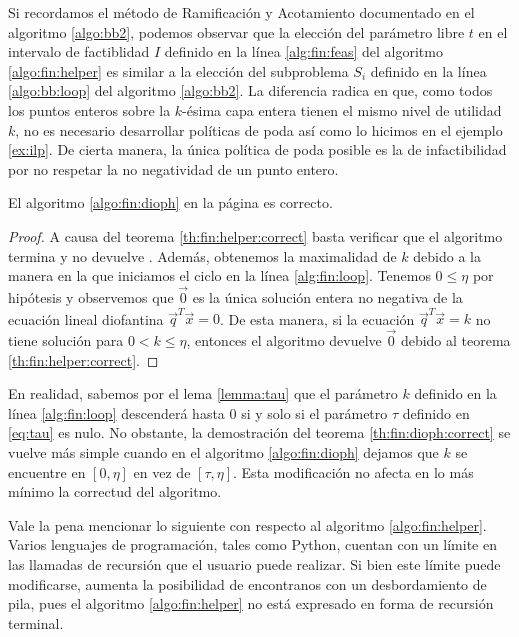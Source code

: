 Si recordamos el método de Ramificación y Acotamiento documentado en el algoritmo \ref{algo:bb2},
podemos observar que la elección del parámetro libre $t$ en el intervalo de factiblidad $I$ definido
en la línea \ref{alg:fin:feas} del algoritmo \ref{algo:fin:helper} es similar a la elección del
subproblema $S_i$ definido en la línea \ref{algo:bb:loop} del algoritmo \ref{algo:bb2}. La
diferencia radica en que, como todos los puntos enteros sobre la $k$-ésima capa entera tienen el
mismo nivel de utilidad $k$, no es necesario desarrollar políticas de poda así como lo hicimos en el
ejemplo \ref{ex:ilp}. De cierta manera, la única política de poda posible es la de infactibilidad
por no respetar la no negatividad de un punto entero.
\begin{theorem}
	\label{th:fin:dioph:correct}
	El algoritmo \ref{algo:fin:dioph} en la página \pageref{algo:fin:dioph} es correcto.
\end{theorem}
\begin{proof}
	A causa del teorema \ref{th:fin:helper:correct} basta verificar que el algoritmo termina y no
	devuelve \NIL. Además, obtenemos la maximalidad de $k$ debido a la manera en la que iniciamos el
	ciclo en la línea \ref{alg:fin:loop}. Tenemos $0 \leq \eta$ por hipótesis y observemos que
	$\vec{0}$ es la única solución entera no negativa de la ecuación lineal diofantina
	$\vec{q}^T\vec{x} = 0$. De esta manera, si la ecuación $\vec{q}^T\vec{x} = k$ no tiene solución
	para $0 < k \leq \eta$, entonces el algoritmo devuelve $\vec{0}$ debido al teorema
	\ref{th:fin:helper:correct}.
\end{proof}

En realidad, sabemos por el lema \ref{lemma:tau} que el parámetro $k$ definido en la línea
\ref{alg:fin:loop} descenderá hasta 0 si y solo si el parámetro $\tau$ definido en \eqref{eq:tau}
es nulo. No obstante, la demostración del teorema \ref{th:fin:dioph:correct} se vuelve más simple
cuando en el algoritmo \ref{algo:fin:dioph} dejamos que $k$ se encuentre en $[0, \eta]$ en vez de
$[\tau, \eta]$.
Esta modificación no afecta en lo más mínimo la correctud del algoritmo.

Vale la pena mencionar lo siguiente con respecto al algoritmo \ref{algo:fin:helper}. Varios
lenguajes de programación, tales como Python, cuentan con un límite en las llamadas de recursión que
el usuario puede realizar. Si bien este límite puede modificarse, aumenta la posibilidad de
encontranos con un desbordamiento de pila, pues el algoritmo \ref{algo:fin:helper} no está expresado
en forma de recursión terminal.

